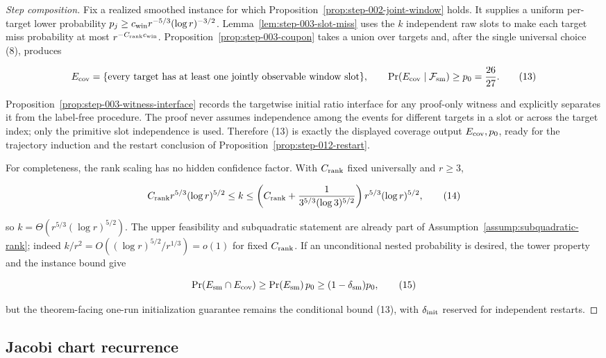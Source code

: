 \begin{proof}[Step composition]
Fix a realized smoothed instance for which
Proposition~\ref{prop:step-002-joint-window} holds. It supplies a uniform
per-target lower probability \(p_j\ge c_{\rm win}r^{-5/3}(\log r)^{-3/2}\).
Lemma~\ref{lem:step-003-slot-miss} uses the \(k\) independent raw slots to
make each target miss probability at most \(r^{-C_{\rm rank}c_{\rm win}}\).
Proposition~\ref{prop:step-003-coupon} takes a union over targets and, after
the single universal choice (8), produces

\[
E_{\rm cov}=\{\text{every target has at least one jointly observable
window slot}\},\qquad
\Pr(E_{\rm cov}\mid\mathcal F_{\rm sm})\ge p_0={26\over27}.
\tag{13}
\]

Proposition~\ref{prop:step-003-witness-interface} records the targetwise initial
ratio interface for any proof-only witness and explicitly separates it from
the label-free procedure. The proof never assumes independence among the
events for different targets in a slot or across the target index; only the
primitive slot independence is used. Therefore (13) is exactly the
displayed coverage output \(E_{\rm cov},p_0\), ready for the trajectory
induction and the restart conclusion of Proposition~\ref{prop:step-012-restart}.

For completeness, the rank scaling has no hidden confidence factor. With
\(C_{\rm rank}\) fixed universally and \(r\ge3\),

\[
C_{\rm rank}r^{5/3}(\log r)^{5/2}\le k
\le\left(C_{\rm rank}+{1\over3^{5/3}(\log3)^{5/2}}\right)
 r^{5/3}(\log r)^{5/2},
\tag{14}
\]

so \(k=\Theta(r^{5/3}(\log r)^{5/2})\). The upper feasibility and
subquadratic statement are already part of Assumption~\ref{assump:subquadratic-rank};
indeed \(k/r^2=O((\log r)^{5/2}/r^{1/3})=o(1)\) for fixed
\(C_{\rm rank}\). If an unconditional nested probability is desired, the
tower property and the instance bound give

\[
\Pr(E_{\rm sm}\cap E_{\rm cov})\ge
\Pr(E_{\rm sm})\,p_0\ge(1-\delta_{\rm sm})p_0,
\tag{15}
\]

but the theorem-facing one-run initialization guarantee remains the
conditional bound (13), with \(\delta_{\rm init}\) reserved for independent
restarts.
\end{proof}

\subsection{Jacobi chart recurrence}\label{app:step-004}

